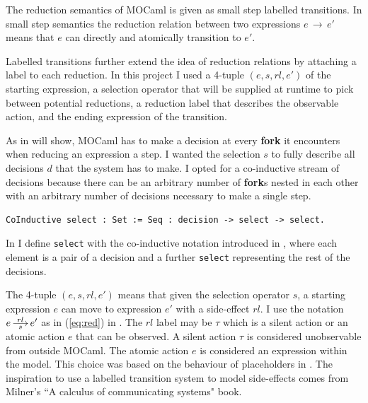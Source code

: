 \documentclass[12pt,twoside,notitlepage]{report}
\newcommand{\red}[2]{\stackon[.05ex]{\stackunder[-0.05ex]{$\longrightarrow$}{$\scriptstyle #1$}}{$\scriptstyle #2$}}
\theoremstyle{plain}%
\theoremstyle{definition}
\theoremstyle{remark}
\begin{document}
The reduction semantics of MOCaml is given as small step labelled transitions. In small step semantics the reduction relation between two expressions $ e\, \rightarrow\, e' $ means that $ e $ can directly and atomically transition to $ e' $. 

Labelled transitions further extend the idea of reduction relations by attaching a label to each reduction. In this project I used a 4-tuple $ (e, s, rl, e') $ of the starting expression, a selection operator that will be supplied at runtime to pick between potential reductions, a reduction label that describes the observable action, and the ending expression of the transition.

As  in  will show, MOCaml has to make a decision at every \textbf{fork} it encounters when reducing an expression a step. I wanted the selection $ s $ to fully describe all decisions $ d $ that the system has to make. I opted for a co-inductive stream of decisions because there can be an arbitrary number of \textbf{fork}s nested in each other with an arbitrary number of decisions necessary to make a single step. \vspace{5mm}

\begin{minipage}{\linewidth}

\begin{lstlisting}[language={Coq},caption={Coq co-inductive decision sequence}, label={lst:coqselectstar}]
CoInductive select : Set := Seq : decision -> select -> select.
\end{lstlisting}

\end{minipage}

In  I define \verb|select| with the co-inductive notation introduced in , where each element is a pair of a decision and a further \verb|select| representing the rest of the decisions. 

The 4-tuple $ (e, s, rl, e') $ means that given the selection operator $ s $, a starting expression $ e $  can move to expression $ e' $ with a side-effect $ rl $. I use the notation $ e\, \red{s}{rl}\, e' $ as in (\ref{eq:red}) in . The $ rl $ label may be $ \tau $ which is a silent action or an atomic action $ e $ that can be observed. A silent action $\tau$ is considered unobservable from outside MOCaml. The atomic action $e$ is considered an expression within the model.  This choice was based on the behaviour of placeholders in . The inspiration to use a labelled transition system to model side-effects comes from Milner's ``A calculus of communicating systems" book\cite{milner1982calculus}.
\end{document}

